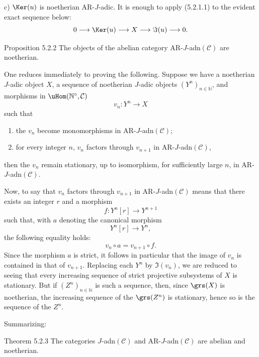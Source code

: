 c) \(\Ker(u)\) is noetherian AR-\(J\)-adic. It is enough to apply (5.2.1.1) to the evident exact sequence below:
\[
0\longrightarrow \Ker(u)\longrightarrow X\longrightarrow \Im(u)\longrightarrow0.
\]

\begin{statement}{Proposition 5.2.2}
The objects of the abelian category AR-\(J\)-adn\((\mathcal C)\) are noetherian.
\end{statement}

\begin{prooftext}
One reduces immediately to proving the following. Suppose we have a noetherian \(J\)-adic object \(X\), a sequence of noetherian \(J\)-adic objects \((Y^n)_{n\in\mathbb N}\), and morphisms in \(\uHom(\mathbb N^\circ,\mathcal C)\)
\[
v_n:Y^n\longrightarrow X
\]
such that
\begin{enumerate}[label=\textup{(\roman*)}]
\item the \(v_n\) become monomorphisms in AR-\(J\)-adn\((\mathcal C)\);
\item for every integer \(n\), \(v_n\) factors through \(v_{n+1}\) in AR-\(J\)-adn\((\mathcal C)\),
\end{enumerate}
then the \(v_n\) remain stationary, up to isomorphism, for sufficiently large \(n\), in AR-\(J\)-adn\((\mathcal C)\).

Now, to say that \(v_n\) factors through \(v_{n+1}\) in AR-\(J\)-adn\((\mathcal C)\) means that there exists an integer \(r\) and a morphism
\[
f:Y^n[r]\longrightarrow Y^{n+1}
\]
such that, with \(a\) denoting the canonical morphism
\[
Y^n[r]\longrightarrow Y^n,
\]
the following equality holds:
\[
v_n\circ a=v_{n+1}\circ f .
\]
Since the morphism \(a\) is strict, it follows in particular that the image of \(v_n\) is contained in that of \(v_{n+1}\). Replacing each \(Y^n\) by \(\Im(v_n)\), we are reduced to seeing that every increasing sequence of strict projective subsystems of \(X\) is stationary. But if \((Z^n)_{n\in\mathbb N}\) is such a sequence, then, since \(\grs(X)\) is noetherian, the increasing sequence of the \(\grs(Z^n)\) is stationary, hence so is the sequence of the \(Z^n\).
\end{prooftext}

Summarizing:

\begin{statement}{Theorem 5.2.3}
The categories \(J\)-adn\((\mathcal C)\) and AR-\(J\)-adn\((\mathcal C)\) are abelian and noetherian.
\end{statement}


